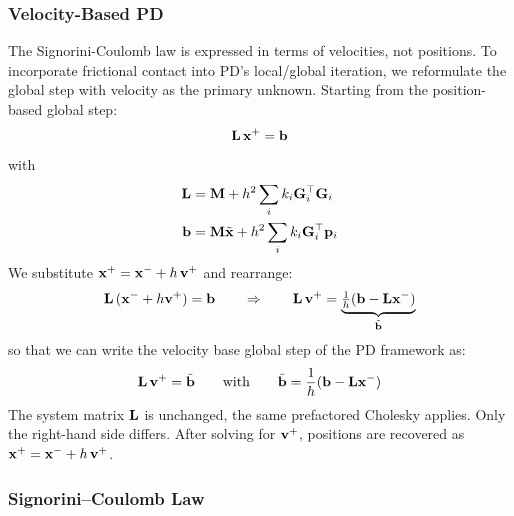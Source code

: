 \subsubsection{Velocity-Based PD}

The Signorini-Coulomb law is expressed in terms of velocities, not positions. To incorporate frictional contact into PD's local/global iteration, we reformulate the global step with velocity as the primary unknown.
\newline Starting from the position-based global step:
\begin{equation*}
    \mathbf{L}\, \mathbf{x}^+ = \mathbf{b}
\end{equation*}
with
\begin{align*}
    \mathbf{L} &= \mathbf{M} + h^2\sum_i k_i\mathbf{G}_i^\top\mathbf{G}_i \\
    \mathbf{b} &= \mathbf{M}\tilde{\mathbf{x}} + h^2\sum_i k_i\mathbf{G}_i^\top\mathbf{p}_i
\end{align*}
We substitute $\mathbf{x}^+ = \mathbf{x}^- + h\,\mathbf{v}^+$ and rearrange:
\begin{equation*}
    \mathbf{L}\, (\mathbf{x}^- + h\mathbf{v}^+)= \mathbf{b} 
    \qquad\Rightarrow\qquad
    \mathbf{L}\,\mathbf{v}^+ = 
    \underbrace{\tfrac{1}{h}(\mathbf{b} - \mathbf{L}\mathbf{x}^-)}_{\tilde{\mathbf{b}}}
\end{equation*}
so that we can write the velocity base global step of the PD framework as:
\begin{equation}
    \mathbf{L}\, \mathbf{v}^+ = \tilde{\mathbf{b}}
    \qquad\text{with}\qquad
    \tilde{\mathbf{b}} = \frac{1}{h}(\mathbf{b} - \mathbf{L}\mathbf{x}^-)
\end{equation}
The system matrix $\mathbf{L}$ is unchanged, the same prefactored Cholesky applies. Only the right-hand side differs. After solving for $\mathbf{v}^+$, positions are recovered as $\mathbf{x}^+ = \mathbf{x}^- + h\,\mathbf{v}^+$.

\subsubsection{Signorini--Coulomb Law}

